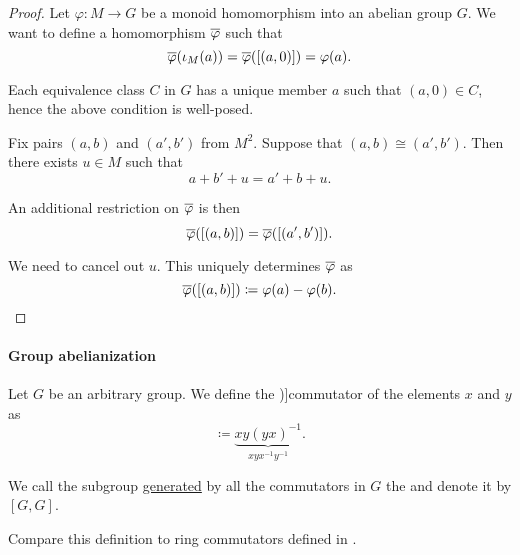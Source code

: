 \begin{proof}
  Let \( \varphi: M \to G \) be a monoid homomorphism into an abelian group \( G \). We want to define a homomorphism \( \oline{\varphi} \) such that
  \begin{equation*}
    \oline{\varphi}(\iota_M(a)) = \oline{\varphi}([(a, 0)]) = \varphi(a).
  \end{equation*}

  Each equivalence class \( C \) in \( G \) has a unique member \( a \) such that \( (a, 0) \in C \), hence the above condition is well-posed.

  Fix pairs \( (a, b) \) and \( (a', b') \) from \( M^2 \). Suppose that \( (a, b) \cong (a', b') \). Then there exists \( u \in M \) such that
  \begin{equation*}
    a + b' + u = a' + b + u.
  \end{equation*}

  An additional restriction on \( \oline{\varphi} \) is then
  \begin{equation*}
    \oline{\varphi}([(a, b)])
    =
    \oline{\varphi}([(a', b')]).
  \end{equation*}

  We need to cancel out \( u \). This uniquely determines \( \oline{\varphi} \) as
  \begin{equation*}
    \oline{\varphi}([(a, b)]) \coloneqq \varphi(a) - \varphi(b).
  \end{equation*}
\end{proof}

\paragraph{Group abelianization}

\begin{definition}\label{def:group_commutator}
  Let \( G \) be an arbitrary group. We define the \term[ru=коммутант (\cite[104]{Мальцев1970АлгебраическиеСистемы})]{commutator} of the elements \( x \) and \( y \) as
  \begin{equation*}
    [x, y] \coloneqq \underbrace{xy(yx)^{-1}}_{xyx^{-1}y^{-1}}.
  \end{equation*}

  We call the subgroup \hyperref[def:group/submodel]{generated} by all the commutators in \( G \) the  and denote it by \( [G, G] \).
\end{definition}
\begin{comments}
  \item Compare this definition to ring commutators defined in .
\end{comments}

